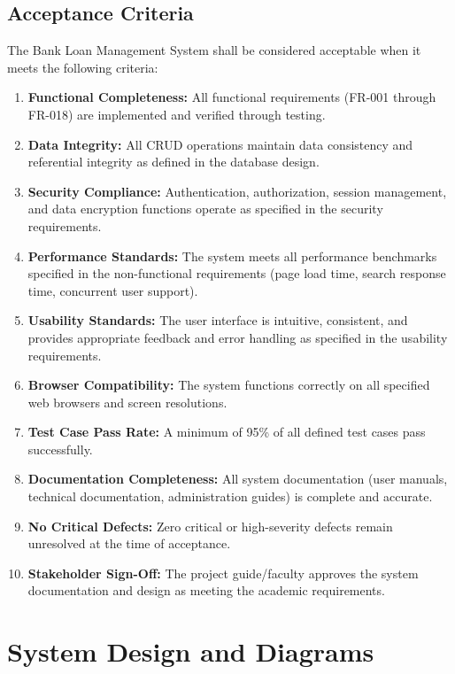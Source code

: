 \documentclass[12pt,a4paper,oneside]{report}
\begin{document}
\section{Acceptance Criteria}

The Bank Loan Management System shall be considered acceptable when it meets the following criteria:

\begin{enumerate}
  \item \textbf{Functional Completeness:} All functional requirements (FR-001 through FR-018) are implemented and verified through testing.
  \item \textbf{Data Integrity:} All CRUD operations maintain data consistency and referential integrity as defined in the database design.
  \item \textbf{Security Compliance:} Authentication, authorization, session management, and data encryption functions operate as specified in the security requirements.
  \item \textbf{Performance Standards:} The system meets all performance benchmarks specified in the non-functional requirements (page load time, search response time, concurrent user support).
  \item \textbf{Usability Standards:} The user interface is intuitive, consistent, and provides appropriate feedback and error handling as specified in the usability requirements.
  \item \textbf{Browser Compatibility:} The system functions correctly on all specified web browsers and screen resolutions.
  \item \textbf{Test Case Pass Rate:} A minimum of 95\% of all defined test cases pass successfully.
  \item \textbf{Documentation Completeness:} All system documentation (user manuals, technical documentation, administration guides) is complete and accurate.
  \item \textbf{No Critical Defects:} Zero critical or high-severity defects remain unresolved at the time of acceptance.
  \item \textbf{Stakeholder Sign-Off:} The project guide/faculty approves the system documentation and design as meeting the academic requirements.
\end{enumerate}

\chapter{System Design and Diagrams}
\end{document}
